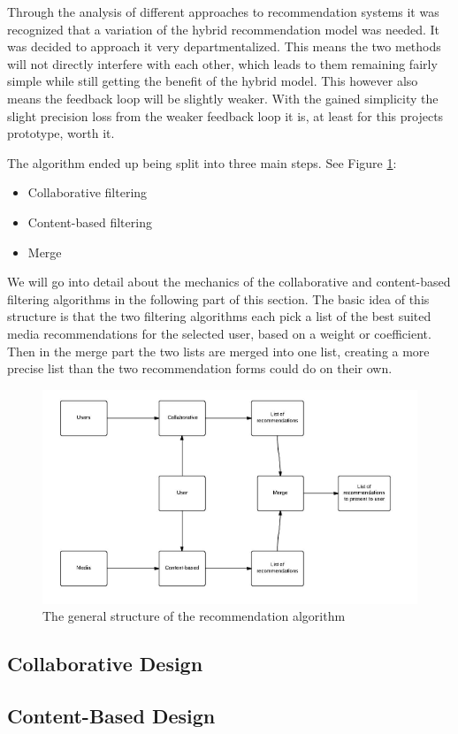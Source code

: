 Through the analysis of different approaches to recommendation systems it was recognized that a variation of the hybrid recommendation model was needed. It was decided to approach it very departmentalized. This means the two methods will not directly interfere with each other, which leads to them remaining fairly simple while still getting the benefit of the hybrid model. This however also means the feedback loop will be slightly weaker. With the gained simplicity the slight precision loss from the weaker feedback loop it is, at least for this projects prototype, worth it.

The algorithm ended up being split into three main steps. See Figure \ref{GenRecAlgo}:
\begin{itemize}
	\item Collaborative filtering
	\item Content-based filtering
	\item Merge
\end{itemize}

We will go into detail about the mechanics of the collaborative and content-based filtering algorithms in the following part of this section. The basic idea of this structure is that the two filtering algorithms each pick a list of the best suited media recommendations for the selected user, based on a weight or coefficient. Then in the merge part the two lists are merged into one list, creating a more precise list than the two recommendation forms could do on their own.


\begin{figure}[H]
\centering
\includegraphics[width=1\textwidth]{Images/RecommendationAlgo.png}
\caption{The general structure of the recommendation algorithm}
\label{GenRecAlgo}
\end{figure}


\subsection{Collaborative Design}
\label{CollaborativeDes}

\subsection{Content-Based Design}
\label{ContentBasedDes}
